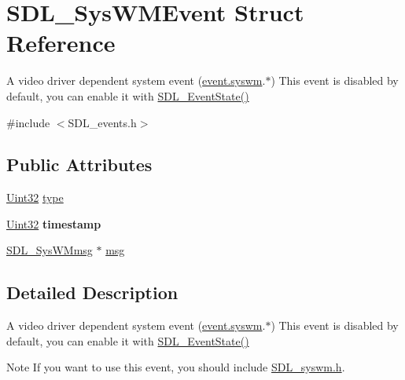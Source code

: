 \hypertarget{structSDL__SysWMEvent}{}\section{S\+D\+L\+\_\+\+Sys\+W\+M\+Event Struct Reference}
\label{structSDL__SysWMEvent}


A video driver dependent system event (\hyperlink{unionSDL__Event_ab3b2eaf5348d4c50a51b1f297fdef537}{event.\+syswm}.$\ast$) This event is disabled by default, you can enable it with \hyperlink{SDL__events_8h_afb772893e1c46f186fa39a4defe76df3}{S\+D\+L\+\_\+\+Event\+State()}  




{\ttfamily \#include $<$S\+D\+L\+\_\+events.\+h$>$}

\subsection*{Public Attributes}
\begin{DoxyCompactItemize}
\item 
\hyperlink{SDL__stdinc_8h_add440eff171ea5f55cb00c4a9ab8672d}{Uint32} \hyperlink{structSDL__SysWMEvent_a84697e96cb16bf6a570e10b5bfdcd392}{type}
\item 
\hypertarget{structSDL__SysWMEvent_a5d3cb97006d99b620c2671c27bd82c06}{}\hyperlink{SDL__stdinc_8h_add440eff171ea5f55cb00c4a9ab8672d}{Uint32} {\bfseries timestamp}\label{structSDL__SysWMEvent_a5d3cb97006d99b620c2671c27bd82c06}

\item 
\hyperlink{structSDL__SysWMmsg}{S\+D\+L\+\_\+\+Sys\+W\+Mmsg} $\ast$ \hyperlink{structSDL__SysWMEvent_ad5e3dc68aa15582cd0641847d41c74e8}{msg}
\end{DoxyCompactItemize}


\subsection{Detailed Description}
A video driver dependent system event (\hyperlink{unionSDL__Event_ab3b2eaf5348d4c50a51b1f297fdef537}{event.\+syswm}.$\ast$) This event is disabled by default, you can enable it with \hyperlink{SDL__events_8h_afb772893e1c46f186fa39a4defe76df3}{S\+D\+L\+\_\+\+Event\+State()} 

\begin{DoxyNote}{Note}
If you want to use this event, you should include \hyperlink{SDL__syswm_8h}{S\+D\+L\+\_\+syswm.\+h}. 
\end{DoxyNote}


